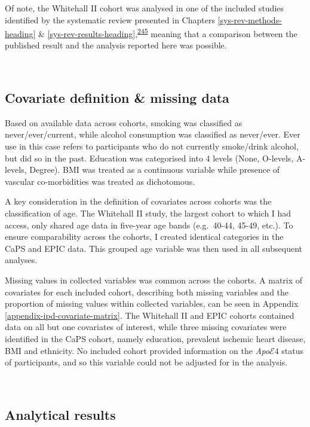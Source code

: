\documentclass[a4paper, twoside]{templates/ociamthesis}
\begin{document}
Of note, the Whitehall II cohort was analysed in one of the included studies identified by the systematic review presented in Chapters \ref{sys-rev-methods-heading} \& \ref{sys-rev-results-heading},\textsuperscript{\protect\hyperlink{ref-tynkkynen2018}{245}} meaning that a comparison between the published result and the analysis reported here was possible.

~

\hypertarget{ipd-covar-definition}{%
\subsection{Covariate definition \& missing data}\label{ipd-covar-definition}}

Based on available data across cohorts, smoking was classified as never/ever/current, while alcohol consumption was classified as never/ever. Ever use in this case refers to participants who do not currently smoke/drink alcohol, but did so in the past. Education was categorised into 4 levels (None, O-levels, A-levels, Degree). BMI was treated as a continuous variable while presence of vascular co-morbidities was treated as dichotomous.

A key consideration in the definition of covariates across cohorts was the classification of age. The Whitehall II study, the largest cohort to which I had access, only shared age data in five-year age bands (e.g.~40-44, 45-49, etc.). To ensure comparability across the cohorts, I created identical categories in the CaPS and EPIC data. This grouped age variable was then used in all subsequent analyses.

Missing values in collected variables was common across the cohorts. A matrix of covariates for each included cohort, describing both missing variables and the proportion of missing values within collected variables, can be seen in Appendix \ref{appendix-ipd-covariate-matrix}. The Whitehall II and EPIC cohorts contained data on all but one covariates of interest, while three missing covariates were identified in the CaPS cohort, namely education, prevalent ischemic heart disease, BMI and ethnicity. No included cohort provided information on the \emph{Apo}\(\mathcal{E}4\) status of participants, and so this variable could not be adjusted for in the analysis.

~

\hypertarget{analytical-results}{%
\subsection{Analytical results}\label{analytical-results}}
\end{document}
